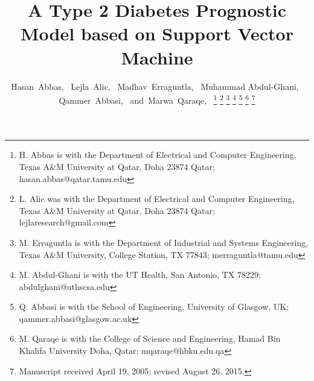 \documentclass[journal,comsoc]{IEEEtran}
\renewcommand{\^}{\hat}  %
\begin{document}
%
\title{A Type 2 Diabetes Prognostic Model based on Support Vector Machine}
%
%

\author{Hasan~Abbas,~
Lejla~Alic,~
Madhav~Erraguntla,~
Muhammad Abdul-Ghani,~
Qammer~Abbasi,~
and~Marwa~Qaraqe,~%
\thanks{H. Abbas is with the Department
of Electrical and Computer Engineering, Texas A\&M University at Qatar, Doha 23874 Qatar;  hasan.abbas@qatar.tamu.edu}%
\thanks{L. Alic was with the Department
of Electrical and Computer Engineering, Texas A\&M University at Qatar, Doha 23874 Qatar; lejlaresearch@gmail.com}%
\thanks{M. Erraguntla is with the Department of Industrial and Systems Engineering, Texas A\&M University, College Station, TX 77843; merraguntla@tamu.edu}%
\thanks{M. Abdul-Ghani is with the UT Health, San Antonio, TX 78229; abdulghani@uthscsa.edu}%
\thanks{Q. Abbasi is with the School of Engineering, University of Glasgow, UK; qammer.abbasi@glasgow.ac.uk}%
\thanks{M. Qaraqe is with the College of Science and Engineering, Hamad Bin Khalifa University Doha, Qatar; mqaraqe@hbku.edu.qa}%
\thanks{Manuscript received April 19, 2005; revised August 26, 2015.}}

%
%
\end{document}

